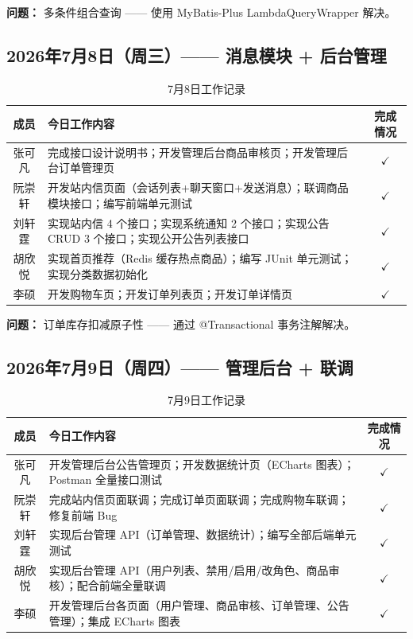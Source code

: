 \documentclass[12pt,a4paper,UTF8]{ctexart}
\begin{document}
\textbf{问题：} 多条件组合查询 —— 使用 MyBatis-Plus LambdaQueryWrapper 解决。

\subsection{2026年7月8日（周三）—— 消息模块 + 后台管理}

\begin{table}[H]
\centering
\caption{7月8日工作记录}
\begin{tabularx}{\textwidth}{c X c}
\toprule
\textbf{成员} & \textbf{今日工作内容} & \textbf{完成情况} \\
\midrule
张可凡 & 完成接口设计说明书；开发管理后台商品审核页；开发管理后台订单管理页 & $\checkmark$ \\
\hline
阮崇轩 & 开发站内信页面（会话列表+聊天窗口+发送消息）；联调商品模块接口；编写前端单元测试 & $\checkmark$ \\
\hline
刘轩霆 & 实现站内信 4 个接口；实现系统通知 2 个接口；实现公告 CRUD 3 个接口；实现公开公告列表接口 & $\checkmark$ \\
\hline
胡欣悦 & 实现首页推荐（Redis 缓存热点商品）；编写 JUnit 单元测试；实现分类数据初始化 & $\checkmark$ \\
\hline
李硕 & 开发购物车页；开发订单列表页；开发订单详情页 & $\checkmark$ \\
\bottomrule
\end{tabularx}
\end{table}

\textbf{问题：} 订单库存扣减原子性 —— 通过 @Transactional 事务注解解决。

\subsection{2026年7月9日（周四）—— 管理后台 + 联调}

\begin{table}[H]
\centering
\caption{7月9日工作记录}
\begin{tabularx}{\textwidth}{c X c}
\toprule
\textbf{成员} & \textbf{今日工作内容} & \textbf{完成情况} \\
\midrule
张可凡 & 开发管理后台公告管理页；开发数据统计页（ECharts 图表）；Postman 全量接口测试 & $\checkmark$ \\
\hline
阮崇轩 & 完成站内信页面联调；完成订单页面联调；完成购物车联调；修复前端 Bug & $\checkmark$ \\
\hline
刘轩霆 & 实现后台管理 API（订单管理、数据统计）；编写全部后端单元测试 & $\checkmark$ \\
\hline
胡欣悦 & 实现后台管理 API（用户列表、禁用/启用/改角色、商品审核）；配合前端全量联调 & $\checkmark$ \\
\hline
李硕 & 开发管理后台各页面（用户管理、商品审核、订单管理、公告管理）；集成 ECharts 图表 & $\checkmark$ \\
\bottomrule
\end{tabularx}
\end{table}
\end{document}
